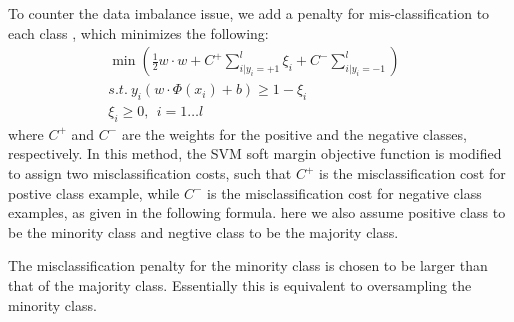 To counter the data imbalance issue, we add a penalty for mis-classification
to each class \cite{osuna1997support}, which minimizes the following:
\begin{align}
\min \left(\frac{1}{2} w \cdot w + C^+ \sum^l_{i | y_i=+1}\xi_i 
	+ C^- \sum^l_{i | y_i=-1}\right) & \nonumber\\
s.t.~ y_i(w \cdot \Phi(x_i) + b) \ge 1-\xi_i &\\
\xi_i \ge 0,~~  i=1\ldots l \nonumber&
\end{align}
where $C^{+}$ and $C^{-}$ are the weights for the positive and
the negative classes, respectively. 
In this method, the SVM soft margin objective function
is modified to assign two misclassification costs, such that $C^+$ is the misclassification
cost for postive class example, while $C^-$ is the misclassification cost for negative class examples,
as given in the following formula. here we also assume positive class to be the minority class and
negtive class to be the majority class.

The misclassification penalty for the minority class is chosen to be larger than that of the majority class.
Essentially this is equivalent to oversampling the minority class. 

